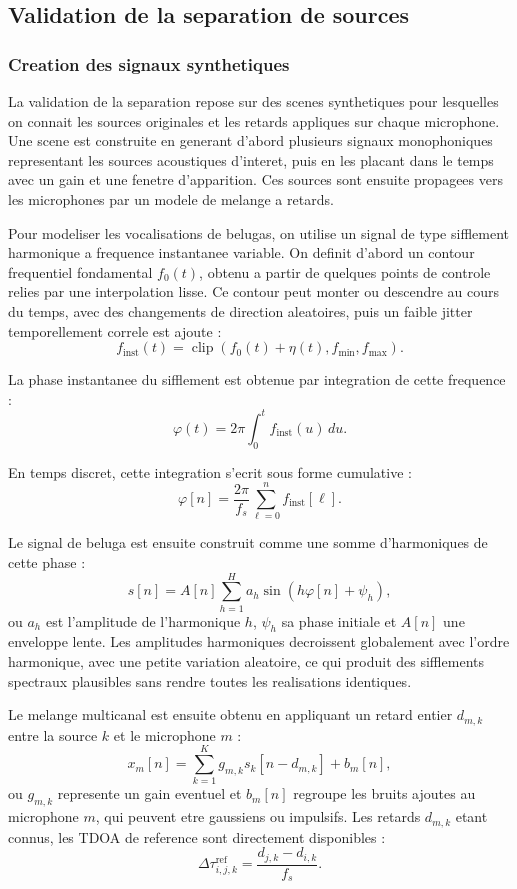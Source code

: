 \documentclass[11pt,a4paper]{article}
\begin{document}
\subsection{Validation de la separation de sources}

\subsubsection{Creation des signaux synthetiques}

La validation de la separation repose sur des scenes synthetiques pour
lesquelles on connait les sources originales et les retards appliques sur chaque
microphone. Une scene est construite en generant d'abord plusieurs signaux
monophoniques representant les sources acoustiques d'interet, puis en les
placant dans le temps avec un gain et une fenetre d'apparition. Ces sources sont
ensuite propagees vers les microphones par un modele de melange a retards.

Pour modeliser les vocalisations de belugas, on utilise un signal de type
sifflement harmonique a frequence instantanee variable. On definit d'abord un
contour frequentiel fondamental $f_0(t)$, obtenu a partir de quelques points de
controle relies par une interpolation lisse. Ce contour peut monter ou descendre
au cours du temps, avec des changements de direction aleatoires, puis un faible
jitter temporellement correle est ajoute :
\[
  f_{\mathrm{inst}}(t)
    =
    \operatorname{clip}
    \left(
      f_0(t)+\eta(t),
      f_{\min},
      f_{\max}
    \right).
\]

La phase instantanee du sifflement est obtenue par integration de cette
frequence :
\[
  \varphi(t)
    =
    2\pi
    \int_0^t
    f_{\mathrm{inst}}(u)\,du.
\]

En temps discret, cette integration s'ecrit sous forme cumulative :
\[
  \varphi[n]
    =
    \frac{2\pi}{f_s}
    \sum_{\ell=0}^{n}
    f_{\mathrm{inst}}[\ell].
\]

Le signal de beluga est ensuite construit comme une somme d'harmoniques de cette
phase :
\[
  s[n]
    =
    A[n]
    \sum_{h=1}^{H}
    a_h
    \sin\left(
      h\varphi[n]+\psi_h
    \right),
\]
ou $a_h$ est l'amplitude de l'harmonique $h$, $\psi_h$ sa phase initiale et
$A[n]$ une enveloppe lente. Les amplitudes harmoniques decroissent globalement
avec l'ordre harmonique, avec une petite variation aleatoire, ce qui produit des
sifflements spectraux plausibles sans rendre toutes les realisations identiques.


Le melange multicanal est ensuite obtenu en appliquant un retard entier
$d_{m,k}$ entre la source $k$ et le microphone $m$ :
\[
  x_m[n]
    =
    \sum_{k=1}^{K}
    g_{m,k}
    s_k[n-d_{m,k}]
    +
    b_m[n],
\]
ou $g_{m,k}$ represente un gain eventuel et $b_m[n]$ regroupe les bruits
ajoutes au microphone $m$, qui peuvent etre gaussiens ou impulsifs. Les retards $d_{m,k}$ etant connus, 
les TDOA de reference sont directement disponibles : 
\[
  \Delta\tau_{i,j,k}^{\mathrm{ref}}
    =
    \frac{d_{j,k}-d_{i,k}}{f_s}.
\]
\end{document}
